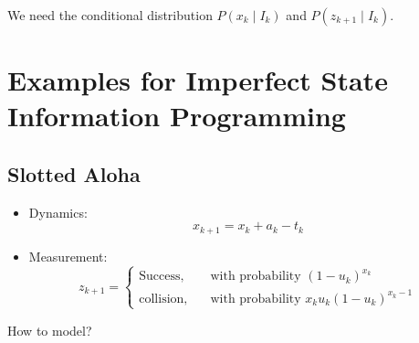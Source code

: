 We need the conditional distribution $P(x_k\mid I_k)$ and $P(z_{k+1}\mid I_k)$.

\section{Examples for Imperfect State Information Programming}
\subsection{Slotted Aloha}
\begin{itemize}
\item
Dynamics:
\[
x_{k+1}=x_k+a_k-t_k
\]
\item
Measurement:
\[
z_{k+1}=
\left\{
\begin{aligned}
\text{Success},&\quad\text{with probability $(1-u_k)^{x_k}$}\\
\text{collision},&\quad\text{with probability $x_ku_k(1-u_k)^{x_k-1}$}
\end{aligned}
\right.
\]
\end{itemize}
How to model?
